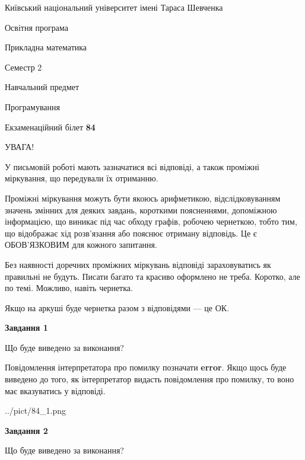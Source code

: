 \documentclass[12pt, ukrainian]{article}
\begin{document}
{{\begin {small}\par
{ \center  Київський національний університет імені Тараса Шевченка \par}
{\parbox {5 cm}{Освітня програма \hfill}{\parbox {7 cm}{Прикладна математика \hfill}}\parbox {6 cm}{\hfill Семестр 2}}\par
{\parbox {5 cm} {Навчальний предмет \hfill}\parbox {7 cm}{Програмування \hfill}\parbox {6cm}{\hfill}\par}\vspace{-7pt} \end{small}}{\center Екзаменаційний білет \No \textbf
{ 84 }\par}}
{
\begin {large}
УВАГА!

У письмовій роботі мають зазначатися всі відповіді, а також проміжні міркування, що передували їх отриманню.

Проміжні міркування можуть бути якоюсь арифметикою, відслідковуванням зна\-чень змінних для деяких завдань,
короткими поясненнями, допоміжною інформацією, що виникає під час обходу графів, робочею чернеткою,
тобто тим, що відображає хід розв’язання або пояснює отриману відповідь.
Це є ОБОВ’ЯЗКОВИМ для кожного запитання.

Без наявності доречних проміжних міркувань відповіді зараховуватись як правиль\-ні не будуть.
Писати багато та красиво оформлено не треба. Коротко, але по темі. Можли\-во, навіть чернетка.

Якщо на аркуші буде чернетка разом з відповідями --- це ОК.

\newpage

{\begin {center}\textbf{Завдання 1}\end {center}}\par
Що буде виведено за виконання?

Повідомлення інтерпретатора про помилку позначати \textbf{error}.
Якщо щось буде виведено до того, як інтерпретатор видасть повідомлення про помилку, 
то воно має вказуватись у відповіді. \par


\begin{center}
	{../pict/84_1.png}
\end{center}
\newpage

{\begin {center}\textbf{Завдання 2}\end {center}}\par
Що буде виведено за виконання?


\end{large}}
\end{document}

